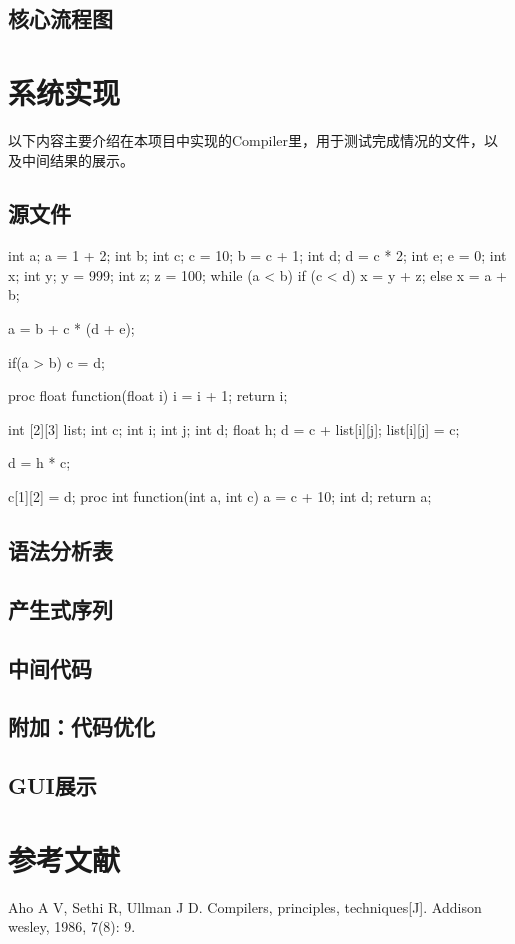 \documentclass{ML}
\begin{document}
\subsection{核心流程图}

\section{系统实现}
    以下内容主要介绍在本项目中实现的Compiler里，用于测试完成情况的文件，以及中间结果的展示。
\subsection{源文件}
\begin{ccode}
    int a;
    a = 1 + 2;
    int b;
    int c;
    c = 10;
    b = c + 1;
    int d;
    d = c * 2;
    int e;
    e = 0;
    int x;
    int y;
    y = 999;
    int z;
    z = 100;
    while (a < b)
    if (c < d) x = y + z; else x = a + b;
    
    a = b + c * (d + e);
    
    if(a > b)
    c = d;
    
    proc float function(float i){
        i = i + 1;
        return i;
        }
        
        int [2][3] list;
        int c;
        int i;
        int j;
        int d;
        float h;
        d = c + list[i][j];
        list[i][j] = c;
        
        d = h * c;
        
        c[1][2] = d;
        proc int function(int a, int c){
            a = c + 10;
            int d;
            return a;
    }        
        \end{ccode}
    \subsection{语法分析表}
    \subsection{产生式序列}
    \subsection{中间代码}
    \subsection{附加：代码优化}
    \subsection{GUI展示}
    \appendix
    
\section{参考文献}
\begin{thebibliography}{20}
     Aho A V, Sethi R, Ullman J D. Compilers, principles, techniques[J]. Addison wesley, 1986, 7(8): 9.
\end{thebibliography}
\end{document}
